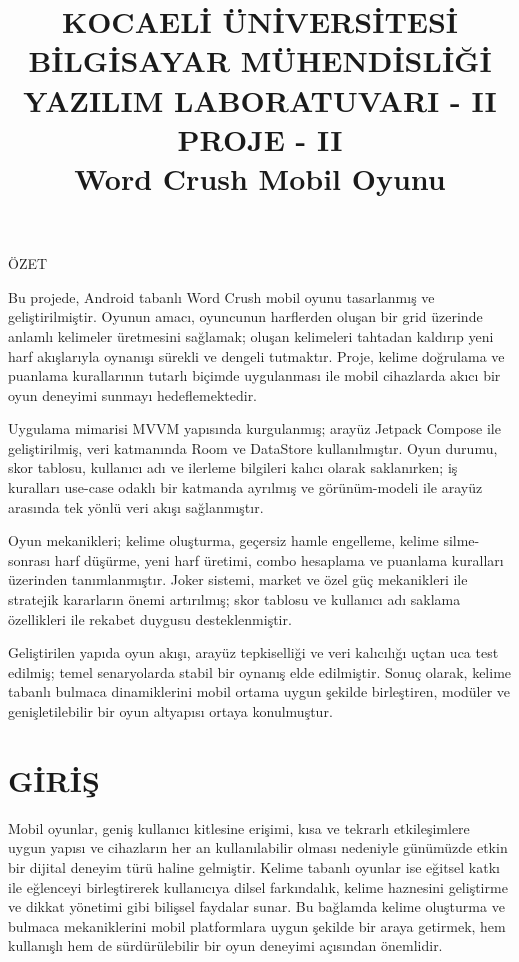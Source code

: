 \documentclass[conference]{IEEEtran}
\title{%
	\normalsize\bfseries
	KOCAELİ ÜNİVERSİTESİ BİLGİSAYAR MÜHENDİSLİĞİ\\[1em]
	YAZILIM LABORATUVARI - II\\
	PROJE - II\\[1em]
	Word Crush Mobil Oyunu
}
\author{
	\IEEEauthorblockN{Saffet Hakan KOÇAK}
	\IEEEauthorblockA{%
		Bilgisayar Mühendisliği\\
		Kocaeli Üniversitesi\\
		230202058%
	}
	\and
	\IEEEauthorblockN{Yusuf BÜLBÜL}
	\IEEEauthorblockA{%
		Bilgisayar Mühendisliği\\
		Kocaeli Üniversitesi\\
		230202050%
	}
}
\renewenvironment{abstract}{%
	\par\noindent
	{\normalfont\normalsize ÖZET}\par\medskip
	\normalfont\normalsize
}{%
	\par
}
\begin{document}
\maketitle

\begin{abstract}
Bu projede, Android tabanlı Word Crush mobil oyunu tasarlanmış ve
geliştirilmiştir. Oyunun amacı, oyuncunun harflerden oluşan bir grid
üzerinde anlamlı kelimeler üretmesini sağlamak; oluşan kelimeleri tahtadan
kaldırıp yeni harf akışlarıyla oynanışı sürekli ve dengeli tutmaktır. Proje,
kelime doğrulama ve puanlama kurallarının tutarlı biçimde uygulanması ile
mobil cihazlarda akıcı bir oyun deneyimi sunmayı hedeflemektedir.

Uygulama mimarisi MVVM yapısında kurgulanmış; arayüz Jetpack Compose ile
geliştirilmiş, veri katmanında Room ve DataStore kullanılmıştır. Oyun
durumu, skor tablosu, kullanıcı adı ve ilerleme bilgileri kalıcı olarak
saklanırken; iş kuralları use-case odaklı bir katmanda ayrılmış ve
görünüm-modeli ile arayüz arasında tek yönlü veri akışı sağlanmıştır.

Oyun mekanikleri; kelime oluşturma, geçersiz hamle engelleme, kelime
silme-sonrası harf düşürme, yeni harf üretimi, combo hesaplama ve
puanlama kuralları üzerinden tanımlanmıştır. Joker sistemi, market ve
özel güç mekanikleri ile stratejik kararların önemi artırılmış; skor
tablosu ve kullanıcı adı saklama özellikleri ile rekabet duygusu
desteklenmiştir.

Geliştirilen yapıda oyun akışı, arayüz tepkiselliği ve veri kalıcılığı
uçtan uca test edilmiş; temel senaryolarda stabil bir oynanış elde
edilmiştir. Sonuç olarak, kelime tabanlı bulmaca dinamiklerini mobil
ortama uygun şekilde birleştiren, modüler ve genişletilebilir bir oyun
altyapısı ortaya konulmuştur.
\end{abstract}

\section{GİRİŞ}

Mobil oyunlar, geniş kullanıcı kitlesine erişimi, kısa ve tekrarlı
etkileşimlere uygun yapısı ve cihazların her an kullanılabilir olması
nedeniyle günümüzde etkin bir dijital deneyim türü haline gelmiştir.
Kelime tabanlı oyunlar ise eğitsel katkı ile eğlenceyi birleştirerek
kullanıcıya dilsel farkındalık, kelime haznesini geliştirme ve dikkat
yönetimi gibi bilişsel faydalar sunar. Bu bağlamda kelime oluşturma ve
bulmaca mekaniklerini mobil platformlara uygun şekilde bir araya getirmek,
hem kullanışlı hem de sürdürülebilir bir oyun deneyimi açısından önemlidir.
\end{document}
